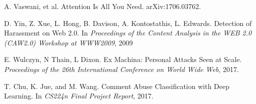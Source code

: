 \documentclass{article}
\begin{document}
\begin{thebibliography}{9}
A. Vaswani, et al. Attention Is All You Need. arXiv:1706.03762.

D. Yin, Z. Xue, L. Hong, B. Davison, A. Kontostathis, L. Edwards. Detection of Harassment on Web 2.0. In \textit{Proceedings of the Content Analysis in the WEB 2.0 (CAW2.0) Workshop at WWW2009}, 2009

E. Wulczyn, N Thain, L Dixon. Ex Machina: Personal Attacks Seen at Scale. \textit{Proceedings of the 26th International Conference on World Wide Web}, 2017.

T. Chu, K. Jue, and M. Wang. Comment Abuse Classification with Deep Learning. In \textit{CS224n Final Project Report}, 2017.

\end{thebibliography}
\end{document}

